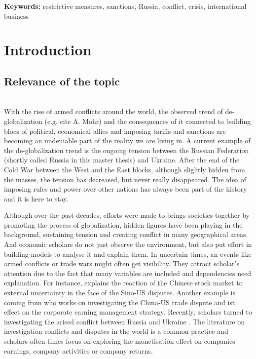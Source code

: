 \documentclass[12pt,a4paper]{article}
\begin{document}
\textbf{Keywords:} restrictive measures, sanctions, Russia, conflict, crisis, international business  



\newpage
\fancyhead{}
\fancyhead[R]{\leftmark} 
\section{Introduction}
\label{chap:intro}
\setcounter{page}{1}


\subsection{Relevance of the topic}
\label{subchap:intro_relevance}\\
With the rise of armed conflicts around the world, the observed trend of de-globalization (e.g. cite A. Mohr) and the consequences of it connected to building blocs of political, economical allies and imposing tariffs and sanctions are becoming an undeniable part of the reality we are living in. A current example of the de-globalization trend is the ongoing tension between the Russian Federation (shortly called Russia in this master thesis) and Ukraine. After the end of the Cold War between the West and the East blocks, although slightly hidden from the masses, the tension has decreased, but never really disappeared. The idea of imposing rules and power over other nations has always been part of the history and it is here to stay. 

Although over the past decades, efforts were made to brings societies together by promoting the process of globalization, hidden figures have been playing in the background, sustaining tension and creating conflict in many geographical areas. And economic scholars do not just observe the environment, but also put effort in building models to analyse it and explain them. In uncertain times, an events like armed conflicts or trade wars might often get visibility. They attract scholar's attention due to the fact that many variables are included and dependencies need explanation. For instance, \cite{gu_how_2021} explains the reaction of the Chinese stock market to external uncertainty in the face of the Sino-US disputes. Another example is coming from \cite{li_china-us_2020} who works on investigating the China-US trade dispute and ist effect on the corporate earning management strategy. Recently, scholars turned to investigating the arised conflict between Russia and Ukraine \citep{assaf_price_2023}. The literature on investigation conflicts and disputes in the world is a common practice and scholars often times focus on exploring the monetisation effect on companies earnings, company activities or company returns. 
\end{document}
